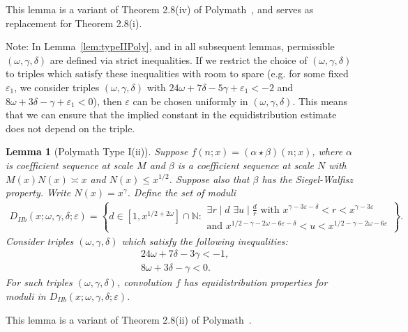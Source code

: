 \documentclass{amsart}
\newtheorem{lemma}{Lemma}
\numberwithin{equation}{section}
\begin{document}
This lemma is a variant  of Theorem 2.8(iv) of Polymath~\cite{Polymath:2014:EDZ}, and   serves as  replacement for Theorem 2.8(i).


\medskip Note: In Lemma~\ref{lem:typeIIPoly}, and in all subsequent lemmas, permissible $(\omega,\gamma,\delta)$ are defined via strict inequalities. If we restrict the choice of $(\omega,\gamma,\delta)$ to triples which satisfy these inequalities with room to spare (e.g. for some fixed $\varepsilon_1$, we consider triples $(\omega,\gamma,\delta)$ with $24\omega + 7\delta -5\gamma + \varepsilon_1 <-2$ and $8\omega + 3\delta -\gamma + \varepsilon_1 <0$), then $\varepsilon$ can be chosen uniformly in $(\omega,\gamma,\delta)$. This means that we can ensure that the implied constant in the equidistribution estimate does not depend on the triple.



 
\begin{lemma}[Polymath Type I(ii)] \label{lem:typeI(ii)Poly} 
Suppose $f(n;x) = (\alpha \star \beta)(n;x)$, where $\alpha$ is  coefficient sequence at scale $M$ and $\beta$ is a  coefficient sequence at scale $N$ with $M(x) N(x) \asymp x$ and $N(x) \leq x^{1/2}$. Suppose also that $\beta$ has the Siegel-Walfisz property. Write $N(x) = x^\gamma$. Define the set of moduli
\begin{align*}
D_{IIb}(x;\omega,\gamma,\delta;\varepsilon) = \left\{d \in  [1, x^{1/2+2\omega}]\cap \mathbb{N}:  \begin{array}{l} 
\exists r \mid d \,\, \exists u \mid \frac{d}{r}  \mbox{ with } x^{\gamma -3\varepsilon-\delta} < r < x^{\gamma - 3\varepsilon} \\ \mbox{and } x^{1/2 -\gamma-2\omega -6 \varepsilon-\delta } < u < x^{1/2-\gamma-2\omega  -6\varepsilon}
\end{array}\right\}.
\end{align*}
Consider triples $(\omega,\gamma,\delta)$ which satisfy the following inequalities: 
 \begin{align*}
  &          24\omega +7\delta  -3\gamma  <-1,  \\     
 &        8\omega+3\delta -  \gamma    <0.
 \end{align*} 
For such triples  $(\omega,\gamma,\delta)$, convolution $f$ has equidistribution properties for moduli in $D_{IIb}(x;\omega,\gamma,\delta;\varepsilon)$.
\end{lemma}

This lemma is a variant  of Theorem 2.8(ii) of Polymath~\cite{Polymath:2014:EDZ}.
\end{document}
